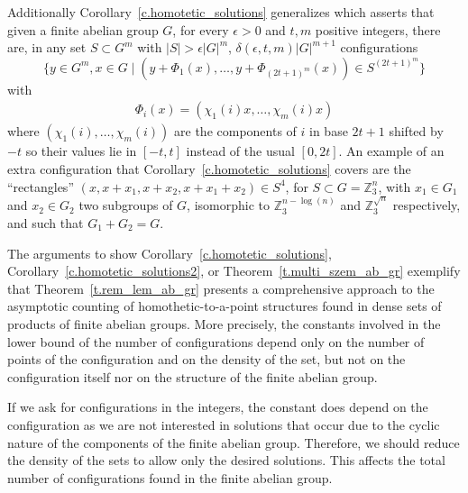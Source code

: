 \documentclass[10pt]{article}
\newcommand{\Z}{\mathbb Z}
\begin{document}
Additionally Corollary~\ref{c.homotetic_solutions} generalizes \cite[Theorem~B.1]{tao12} which asserts that given a finite abelian group $G$, for every $\epsilon>0$ and $t,m$ positive integers, there are, in any set $S\subset G^m$ with $|S|>\epsilon |G|^m$,
 $\delta(\epsilon,t,m) |G|^{m+1}$ configurations
\begin{displaymath}
	\{y\in G^m, x\in G \; | \; (y+\Phi_1(x),\ldots,y+\Phi_{(2t+1)^m}(x))\in S^{(2t+1)^m}\}
\end{displaymath}
with 
\begin{align}
	\Phi_i(x)=(\chi_1(i) x,\ldots,\chi_m(i) x) \nonumber
\end{align}
where $(\chi_1(i),\ldots,\chi_m(i))$ are the components of $i$ in base $2t+1$ shifted by $-t$ so their values lie in $[-t,t]$ instead of the usual $[0,2t]$.
An example of an extra configuration that Corollary~\ref{c.homotetic_solutions} covers are the ``rectangles'' $(x,x+x_1,x+x_2,x+x_1+x_2)\in S^4$, for $S\subset G=\Z_3^n$, with $x_1\in G_1$ and $x_2\in G_2$ two subgroups of $G$, isomorphic to $\Z_3^{n-\log(n)}$ and $\Z_3^{\sqrt{n}}$ respectively, and such that $G_1+G_2=G$.



The arguments to show Corollary~\ref{c.homotetic_solutions}, Corollary~\ref{c.homotetic_solutions2}, or Theorem~\ref{t.multi_szem_ab_gr} exemplify that Theorem~\ref{t.rem_lem_ab_gr} presents a comprehensive approach to the asymptotic counting of homothetic-to-a-point structures found in dense sets of products of finite abelian groups. More precisely, the constants involved in the lower bound of the number of configurations depend only on the number of points of the configuration  and on the density of the set, but not on the configuration itself nor on the structure of the finite abelian group.

If we ask for configurations in the integers, the constant does depend on the configuration as we are not interested in solutions that occur due to the cyclic nature of the components of the finite abelian group. Therefore, we should reduce the density of the sets to allow only the desired solutions. This affects the total number of configurations found in the finite abelian group.
\end{document}
